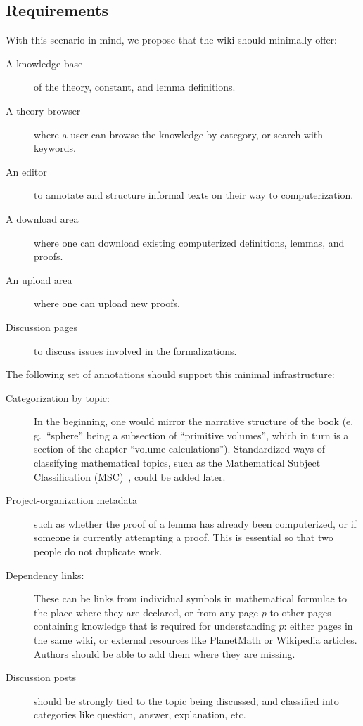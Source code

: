 \subsection{Requirements}
\label{sec:req}

\begin{contribution}
With this scenario in mind, we propose that the wiki should minimally offer: 
\begin{description}
\item[A knowledge base] of the theory, constant, and lemma definitions.
\item[A theory browser] where a user can browse the knowledge by category, or search with keywords.
\item[An editor] to annotate and structure informal texts on their way to
  computerization.
\item[A download area] where one can download existing computerized definitions,
  lemmas, and proofs.
\item[An upload area] where one can upload new proofs.
\item[Discussion pages] to discuss issues involved in the formalizations.
\end{description}

The following set of annotations should support this minimal infrastructure:

\begin{description}
\item[Categorization by topic:] In the beginning, one would mirror the narrative structure
  of the book (e.\,g.\ ``sphere'' being a subsection of ``primitive volumes'', which in turn
  is a section of the chapter ``volume calculations'').  Standardized ways of classifying
  mathematical topics, such as the Mathematical Subject Classification
  (MSC)~\cite{AMS:MSC2000}, could be added later.
\item[Project-organization metadata] such as whether the proof
  of a lemma has already been computerized, or if someone is currently 
  attempting a proof.  This is essential so that two people do not duplicate
  work.
\item[Dependency links:] These can be links from individual symbols in
  mathematical formulae to the place where they are declared, or from any page
  $p$ to other pages containing knowledge that is required for understanding
  $p$: either pages in the same wiki, or external resources like PlanetMath or
  Wikipedia articles.  Authors should be able to add them where they are
  missing.
\item[Discussion posts] should be strongly tied to the topic being
  discussed, and classified into categories like question, answer,
  explanation, etc.
\end{description}


\end{contribution}
